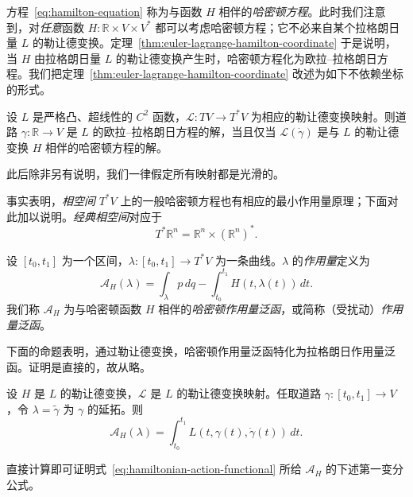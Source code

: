 方程~\eqref{eq:hamilton-equation} 称为与函数 $H$ 相伴的\emph{哈密顿方程}。此时我们注意到，对\emph{任意}函数 $H:\mathbb R\times V\times V^*$ 都可以考虑哈密顿方程；它不必来自某个拉格朗日量 $L$ 的勒让德变换。定理~\ref{thm:euler-lagrange-hamilton-coordinate} 于是说明，当 $H$ 由拉格朗日量 $L$ 的勒让德变换产生时，哈密顿方程化为欧拉--拉格朗日方程。我们把定理~\ref{thm:euler-lagrange-hamilton-coordinate} 改述为如下不依赖坐标的形式。

\begin{theorem}
\label{thm:euler-lagrange-hamilton-invariant}
设 $L$ 是严格凸、超线性的 $C^2$ 函数，$\mathcal L:TV\to T^*V$ 为相应的勒让德变换映射。则道路 $\gamma:\mathbb R\to V$ 是 $L$ 的欧拉--拉格朗日方程的解，当且仅当 $\mathcal L(\dot\gamma)$ 是与 $L$ 的勒让德变换 $H$ 相伴的哈密顿方程的解。
\end{theorem}

此后除非另有说明，我们一律假定所有映射都是光滑的。

事实表明，\emph{相空间} $T^*V$ 上的一般哈密顿方程也有相应的最小作用量原理；下面对此加以说明。\emph{经典相空间}对应于
\[
  T^*\mathbb R^n=\mathbb R^n\times(\mathbb R^n)^*.
\]

\begin{definition}[相空间上的作用量泛函]
\label{def:hamiltonian-action-functional}
设 $[t_0,t_1]$ 为一个区间，$\lambda:[t_0,t_1]\to T^*V$ 为一条曲线。$\lambda$ 的\emph{作用量}定义为
\begin{equation}\label{eq:hamiltonian-action-functional}
  \mathcal A_H(\lambda)
  =\int_\lambda p\,dq-\int_{t_0}^{t_1}H(t,\lambda(t))\,dt.
\end{equation}
我们称 $\mathcal A_H$ 为与哈密顿函数 $H$ 相伴的\emph{哈密顿作用量泛函}，或简称（受扰动）\emph{作用量泛函}。
\end{definition}

下面的命题表明，通过勒让德变换，哈密顿作用量泛函特化为拉格朗日作用量泛函。证明是直接的，故从略。

\begin{proposition}
\label{prop:hamiltonian-lagrangian-action}
设 $H$ 是 $L$ 的勒让德变换，$\mathcal L$ 是 $L$ 的勒让德变换映射。任取道路 $\gamma:[t_0,t_1]\to V$，令 $\lambda=\widetilde\gamma$ 为 $\gamma$ 的延拓。则
\[
  \mathcal A_H(\lambda)
  =\int_{t_0}^{t_1}L(t,\gamma(t),\dot\gamma(t))\,dt.
\]
\end{proposition}

直接计算即可证明式~\eqref{eq:hamiltonian-action-functional} 所给 $\mathcal A_H$ 的下述第一变分公式。


